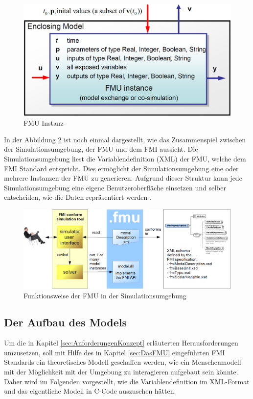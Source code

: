 \begin{figure}[h]
	\centering
	\includegraphics[width=0.5\linewidth]{Bilder/A21_FMIBlock}
	\caption{FMU Instanz \cite[S.9]{25}}
	\label{fig:FMIBlock}
\end{figure}
\newline
In der Abbildung \ref{fig:FMUEinordnung} ist noch einmal dargestellt, wie das Zusammenspiel zwischen der Simulationsumgebung, der FMU und dem FMI aussieht. Die Simulationsumgebung liest die Variablendefinition (XML) der FMU, welche dem FMI Standard entspricht. Dies ermöglicht der Simulationsumgebung eine oder mehrere Instanzen der FMU zu generieren. Aufgrund dieser Struktur kann jede Simulationsumgebung eine eigene Benutzeroberfläche einsetzen und selber entscheiden, wie die Daten repräsentiert werden \cite[S.7]{26}.
\begin{figure}[h]
	\centering
	\includegraphics[width=1\linewidth]{Bilder/A22_User-FMU-FMI}
	\caption{Funktionsweise der FMU in der Simulationsumgebung \cite[S.7]{26}}
	\label{fig:FMUEinordnung}
\end{figure}

\subsection{Der Aufbau des Models}\label{sec:ModelAufbau}
Um die in Kapitel \ref*{sec:AnforderungenKonzept} erläuterten Herausforderungen umzusetzen, soll mit Hilfe des in Kapitel \ref*{sec:DasFMU} eingeführten FMI Standards ein theoretisches Modell geschaffen werden, wie ein Menschenmodell mit der Möglichkeit mit der Umgebung zu interagieren aufgebaut sein könnte. Daher wird im Folgenden vorgestellt, wie die Variablendefinition im XML-Format und das eigentliche Modell in C-Code auszusehen hätten.


